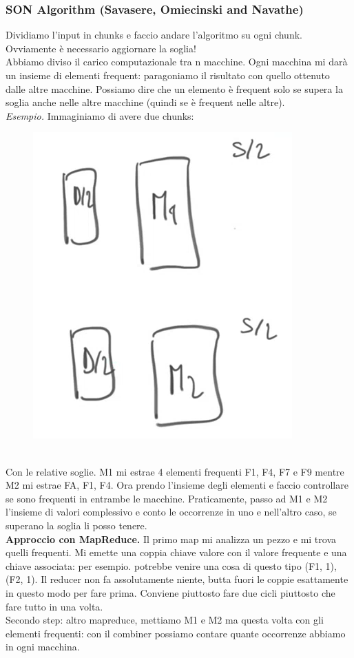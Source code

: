 \newpage

\subsubsection{SON Algorithm (Savasere, Omiecinski and Navathe)}
Dividiamo l'input in chunks e faccio andare l'algoritmo su ogni chunk. Ovviamente è necessario aggiornare la soglia! 
\\
Abbiamo diviso il carico computazionale tra n macchine. Ogni macchina mi darà un insieme di elementi frequent: paragoniamo il risultato con quello ottenuto dalle altre macchine. Possiamo dire che un elemento è frequent solo se supera la soglia anche nelle altre macchine (quindi se è frequent nelle altre). 
\\
\textit{Esempio.} Immaginiamo di avere due chunks:
\\
\begin{figure}[th]
    \centering
    \includegraphics[scale=0.5]{FrequentItems/img/SONalgorithm.png}
\end{figure}
\\
Con le relative soglie. M1 mi estrae 4 elementi frequenti F1, F4, F7 e F9 mentre M2 mi estrae FA, F1, F4. Ora prendo l'insieme degli elementi e faccio controllare se sono frequenti in entrambe le macchine. Praticamente, passo ad M1 e M2 l'insieme di valori complessivo e conto le occorrenze in uno e nell'altro caso, se superano la soglia li posso tenere.
\\
\textbf{Approccio con MapReduce.} Il primo map mi analizza un pezzo e mi trova quelli frequenti. Mi emette una coppia chiave valore con il valore frequente e una chiave associata: per esempio. potrebbe venire una cosa di questo tipo (F1, 1), (F2, 1). Il reducer non fa assolutamente niente, butta fuori le coppie esattamente in questo modo per fare prima. Conviene piuttosto fare due cicli piuttosto che fare tutto in una volta. 
\\
Secondo step: altro mapreduce, mettiamo M1 e M2 ma questa volta con gli elementi frequenti: con il combiner possiamo contare quante occorrenze abbiamo in ogni macchina. 

